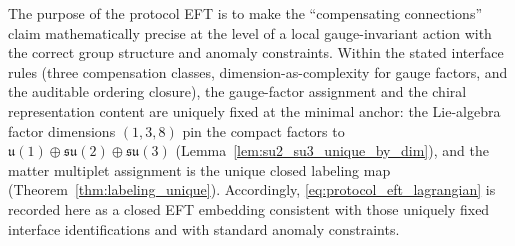 \begin{remark}[Status]\label{rem:protocol_eft_status}
The purpose of the protocol EFT is to make the ``compensating connections'' claim mathematically precise at the level of a local gauge-invariant action with the correct group structure and anomaly constraints.
Within the stated interface rules (three compensation classes, dimension-as-complexity for gauge factors, and the auditable ordering closure), the gauge-factor assignment and the chiral representation content are uniquely fixed at the minimal anchor:
the Lie-algebra factor dimensions $(1,3,8)$ pin the compact factors to $\mathfrak{u}(1)\oplus\mathfrak{su}(2)\oplus\mathfrak{su}(3)$ (Lemma~\ref{lem:su2_su3_unique_by_dim}), and the matter multiplet assignment is the unique closed labeling map (Theorem~\ref{thm:labeling_unique}).
Accordingly, \eqref{eq:protocol_eft_lagrangian} is recorded here as a closed EFT embedding consistent with those uniquely fixed interface identifications and with standard anomaly constraints.
\end{remark}


